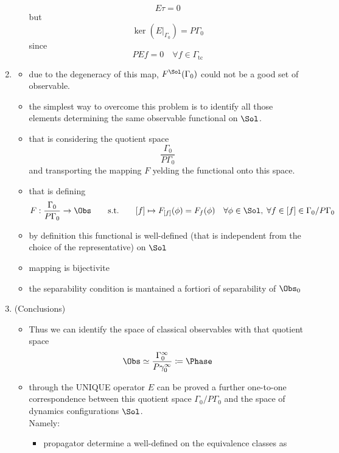 \documentclass[a4paper,11pt]{scrartcl}
\begin{document}
\begin{enumerate}
\begin{itemize}
                $$ E\tau = 0$$
                but
                $$ \ker(E\vert_{\Gamma_0}) = P\Gamma_0 $$
                since
                $$ PE f = 0 \quad \forall f \in \Gamma_\textrm{tc} $$
            \end{itemize}
        \item
            \begin{itemize}
                \item due to the degeneracy of this map, $F^\Sol(\Gamma_0)$ could not be a good set of observable.
                \item the simplest way to overcome this problem is to identify all those elements determining the same observable functional on $\Sol$.
                \item that is considering the quotient space $$\frac{\Gamma_0}{P \Gamma_0}$$
                and transporting the mapping $F$ yelding the functional onto this space.
                \item that is defining
                $$F: \frac{\Gamma_0}{P \Gamma_0} \rightarrow \Obs \qquad 
                \textrm{s.t.} \qquad
                [f] \mapsto F_{[f]}(\phi) = F_f(\phi) \quad 
                \forall \phi \in \Sol , \; \forall f \in [f] \in \Gamma_0 / P \Gamma_0 $$
                \item by definition this functional is well-defined (that is independent from the choice of the representative) on $\Sol$
                \item mapping is bijectivite
                \item the separability condition is mantained a fortiori of separability of $\Obs_0$
            \end{itemize}
        \item (Conclusions)
            \begin{itemize}
                \item Thus we can identify the space of classical observables with that quotient space
                $$ \Obs \simeq \frac{\Gamma_0^\infty}{P \gamma_0^\infty} \coloneqq \Phase$$
                \item through the UNIQUE operator $E$ can be proved a further one-to-one correspondence between this quotient space $\Gamma_0 / P \Gamma_0$ and the space of dynamics configurations $\Sol$.\\
                Namely:
                \begin{itemize}
                    \item propagator determine a  well-defined on the equivalence classes as  

\end{itemize}
\end{itemize}
\end{enumerate}
\end{document}

